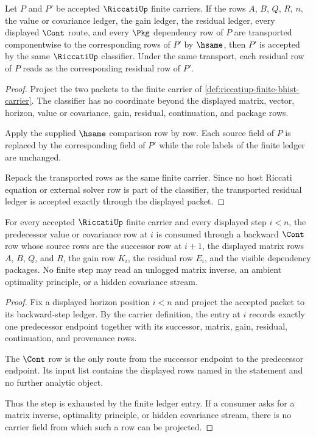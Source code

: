 \begin{theorem}
\label{thm:riccatiup-residual-classifier-stability}
Let $P$ and $P'$ be accepted $\RiccatiUp$ finite carriers. If the rows $A$, $B$, $Q$, $R$, $n$, the value or covariance ledger, the gain ledger, the residual ledger, every displayed $\Cont$ route, and every $\Pkg$ dependency row of $P$ are transported componentwise to the corresponding rows of $P'$ by $\hsame$, then $P'$ is accepted by the same $\RiccatiUp$ classifier. Under the same transport, each residual row of $P$ reads as the corresponding residual row of $P'$.
\end{theorem}
\begin{proof}
Project the two packets to the finite carrier of \autoref{def:riccatiup-finite-bhist-carrier}. The classifier has no coordinate beyond the displayed matrix, vector, horizon, value or covariance, gain, residual, continuation, and package rows.

Apply the supplied $\hsame$ comparison row by row. Each source field of $P$ is replaced by the corresponding field of $P'$ while the role labels of the finite ledger are unchanged.

Repack the transported rows as the same finite carrier. Since no host Riccati equation or external solver row is part of the classifier, the transported residual ledger is accepted exactly through the displayed packet.
\end{proof}

\begin{theorem}
\label{thm:riccatiup-backward-cont-ledger}
For every accepted $\RiccatiUp$ finite carrier and every displayed step $i<n$, the predecessor value or covariance row at $i$ is consumed through a backward $\Cont$ row whose source rows are the successor row at $i+1$, the displayed matrix rows $A$, $B$, $Q$, and $R$, the gain row $K_i$, the residual row $E_i$, and the visible dependency packages. No finite step may read an unlogged matrix inverse, an ambient optimality principle, or a hidden covariance stream.
\end{theorem}
\begin{proof}
Fix a displayed horizon position $i<n$ and project the accepted packet to its backward-step ledger. By the carrier definition, the entry at $i$ records exactly one predecessor endpoint together with its successor, matrix, gain, residual, continuation, and provenance rows.

The $\Cont$ row is the only route from the successor endpoint to the predecessor endpoint. Its input list contains the displayed rows named in the statement and no further analytic object.

Thus the step is exhausted by the finite ledger entry. If a consumer asks for a matrix inverse, optimality principle, or hidden covariance stream, there is no carrier field from which such a row can be projected.
\end{proof}

